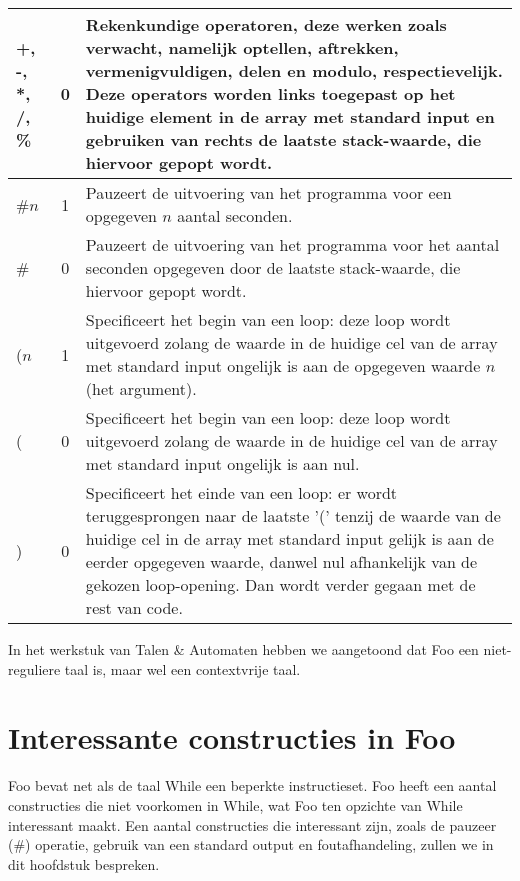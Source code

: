 \documentclass[11pt]{article}
\begin{document}
\begin{center}
\begin{tabular}{ | l | c | p{12cm} | }
    +, -, *, /, \%                          & 0 & Rekenkundige operatoren, deze werken zoals verwacht, namelijk optellen, aftrekken, vermenigvuldigen, delen en modulo, respectievelijk. Deze operators worden links toegepast op het huidige element in de array met standard input en gebruiken van rechts de laatste stack-waarde, die hiervoor gepopt wordt. \\ \hline
    \#\(n\)                                 & 1 & Pauzeert de uitvoering van het programma voor een opgegeven \(n\) aantal seconden. \\ \hline
    \#                                      & 0 & Pauzeert de uitvoering van het programma voor het aantal seconden opgegeven door de laatste stack-waarde, die hiervoor gepopt wordt. \\ \hline
    (\(n\)                                  & 1 & Specificeert het begin van een loop: deze loop wordt uitgevoerd zolang de waarde in de huidige cel van de array met standard input ongelijk is aan de opgegeven waarde \(n\) (het argument). \\ \hline
    (                                       & 0 & Specificeert het begin van een loop: deze loop wordt uitgevoerd zolang de waarde in de huidige cel van de array met standard input ongelijk is aan nul. \\ \hline
    )                                       & 0 & Specificeert het einde van een loop: er wordt teruggesprongen naar de laatste '(' tenzij de waarde van de huidige cel in de array met standard input gelijk is aan de eerder opgegeven waarde, danwel nul afhankelijk van de gekozen loop-opening. Dan wordt verder gegaan met de rest van code. \\ \hline
    \end{tabular}
\end{center}


In het werkstuk van Talen \& Automaten hebben we aangetoond dat Foo een niet-reguliere taal is, maar wel een contextvrije taal.

\section{Interessante constructies in Foo}

Foo bevat net als de taal While een beperkte instructieset. 
Foo heeft een aantal constructies die niet voorkomen in While, wat Foo ten opzichte van While interessant maakt.
Een aantal constructies die interessant zijn, zoals de pauzeer (\#) operatie, gebruik van een standard output en foutafhandeling, zullen we in dit hoofdstuk bespreken. %
\end{document}
